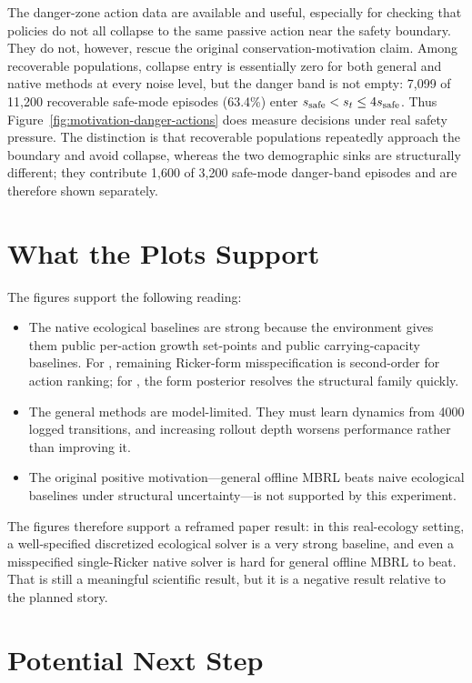 \documentclass[11pt]{article}
\begin{document}
The danger-zone action data are available and useful, especially for checking
that policies do not all collapse to the same passive action near the safety
boundary. They do not, however, rescue the original conservation-motivation
claim. Among recoverable populations, collapse entry is essentially zero for
both general and native methods at every noise level, but the danger band is not
empty: 7{,}099 of 11{,}200 recoverable safe-mode episodes (63.4\%) enter
$s_{\mathrm{safe}} < s_t \le 4s_{\mathrm{safe}}$. Thus Figure~\ref{fig:motivation-danger-actions}
does measure decisions under real safety pressure. The distinction is that
recoverable populations repeatedly approach the boundary and avoid collapse,
whereas the two demographic sinks are structurally different; they contribute
1{,}600 of 3{,}200 safe-mode danger-band episodes and are therefore shown
separately.

\section{What the Plots Support}

The figures support the following reading:
\begin{itemize}
  \item The native ecological baselines are strong because the environment gives
  them public per-action growth set-points and public carrying-capacity
  baselines. For , remaining Ricker-form misspecification is
  second-order for action ranking; for , the form posterior
  resolves the structural family quickly.
  \item The general methods are model-limited. They must learn dynamics from
  4000 logged transitions, and increasing rollout depth worsens performance
  rather than improving it.
  \item The original positive motivation---general offline MBRL beats naive
  ecological baselines under structural uncertainty---is not supported by this
  experiment.
\end{itemize}

The figures therefore support a reframed paper result: in this real-ecology
setting, a well-specified discretized ecological solver is a very strong
baseline, and even a misspecified single-Ricker native solver is hard for
general offline MBRL to beat. That is still a meaningful scientific result, but
it is a negative result relative to the planned story.

\section{Potential Next Step}
\end{document}
